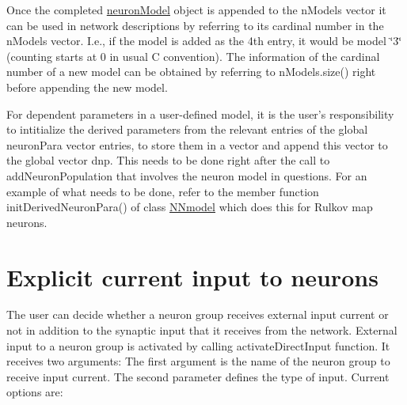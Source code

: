 Once the completed {\ttfamily \hyperlink{structneuronModel}{neuron\+Model}} object is appended to the {\ttfamily n\+Models} vector it can be used in network descriptions by referring to its cardinal number in the n\+Models vector. I.\+e., if the model is added as the 4th entry, it would be model \char`\"{}3\char`\"{} (counting starts at 0 in usual C convention). The information of the cardinal number of a new model can be obtained by referring to {\ttfamily n\+Models.\+size()} right before appending the new model.

For dependent parameters in a user-\/defined model, it is the user's responsibility to intitialize the derived parameters from the relevant entries of the global {\ttfamily neuron\+Para} vector entries, to store them in a vector and append this vector to the global vector {\ttfamily dnp}. This needs to be done right after the call to add\+Neuron\+Population that involves the neuron model in questions. For an example of what needs to be done, refer to the member function {\ttfamily init\+Derived\+Neuron\+Para()} of class {\ttfamily \hyperlink{classNNmodel}{N\+Nmodel}} which does this for Rulkov map neurons.\hypertarget{Manual_sect_explinput}{}\section{Explicit current input to neurons}\label{Manual_sect_explinput}
The user can decide whether a neuron group receives external input current or not in addition to the synaptic input that it receives from the network. External input to a neuron group is activated by calling {\ttfamily activate\+Direct\+Input} function. It receives two arguments\+: The first argument is the name of the neuron group to receive input current. The second parameter defines the type of input. Current options are\+:



